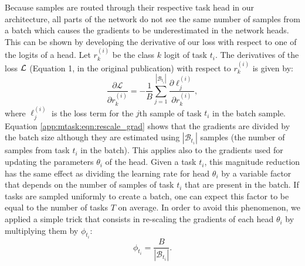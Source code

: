 Because samples are routed through their respective task head in our architecture, all parts of the network do not see the same number of samples from a batch which causes the gradients to be underestimated in the network heads. This can be shown by developing the derivative of our loss with respect to one of the logits of a head. Let $r^{(i)}_{k}$ be the class $k$ logit of task $t_i$. The derivatives of the loss ${\cal L}$ (Equation 1, in the original publication) with respect to $r^{(i)}_k$ is given by:
\begin{equation} 
    \label{app:mtask:eqn:rescale_grad}
    \frac{\partial \mathcal{L}}{\partial r^{(i)}_{k}} = - \frac{1}{B} \sum_{j=1}^{\left|\mathcal{B}_{t_i}\right|} \frac{\partial \ell^{(i)}_j}{\partial r^{(i)}_{k}},
\end{equation}
where $\ell^{(i)}_j$ is the loss term for the $j$th sample of task $t_i$ in the batch sample. Equation \ref{app:mtask:eqn:rescale_grad} shows that the gradients are divided by the batch size although they are estimated using $\left|\mathcal{B}_{t_i}\right|$ samples (\ie the number of samples from task $t_i$ in the batch). This applies also to the gradients used for updating the parameters $\theta_i$ of the head. Given a task $t_i$, this magnitude reduction has the same effect as dividing the learning rate for head $\theta_i$ by a variable factor that depends on the number of samples of task $t_i$ that are present in the batch. If tasks are sampled uniformly to create a batch, one can expect this factor to be equal to the number of tasks $T$ on average. In order to avoid this phenomenon, we applied a simple trick that consists in re-scaling the gradients of each head $\theta_i$ by multiplying them by $\phi_{t_i}$:
\begin{equation}
\phi_{t_i} = \frac{B}{\left|\mathcal{B}_{t_i}\right|}.
\end{equation}




